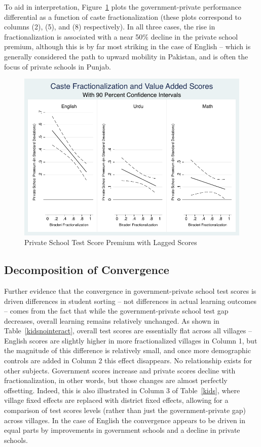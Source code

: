 \documentclass[Eubank_pk_ethnic_sorting.tex]{subfiles}
\begin{document}
To aid in interpretation, Figure~\ref{kidscombined} plots the government-private performance differential as a function of caste fractionalization (these plots correspond to columns (2), (5), and (8) respectively). In all three cases, the rise in fractionalization is associated with a near 50\% decline in the private school premium, although this is by far most striking in the case of English -- which is generally considered the path to upward mobility in Pakistan, and is often the focus of private schools in Punjab.

\begin{figure}[h]
	\caption{Private School Test Score Premium with Lagged Scores}\label{kidscombined}
	\centering
	\includegraphics[scale=0.8]{../results/kids_combined.pdf}
\end{figure}


\subsection{Decomposition of Convergence}\label{village_level_outcomes}

Further evidence that the convergence in government-private school test scores is driven differences in student sorting -- not differences in actual learning outcomes -- comes from the fact that while the government-private school test gap decreases, overall learning remains relatively unchanged. As shown in Table~\ref{kidsnointeract}, overall test scores are essentially flat across all villages -- English scores are slightly higher in more fractionalized villages in Column 1, but the magnitude of this difference is relatively small, and once more demographic controls are added in Column 2 this effect disappears. No relationship exists for other subjects. Government scores increase and private scores decline with fractionalization, in other words, but those changes are almost perfectly offsetting. Indeed, this is also illustrated in Column 3 of Table~\ref{kids}, where village fixed effects are replaced with district fixed effects, allowing for a comparison of test scores levels (rather than just the government-private gap) across villages. In the case of English the convergence appears to be driven in equal parts by improvements in government schools and a decline in private schools.
\end{document}
